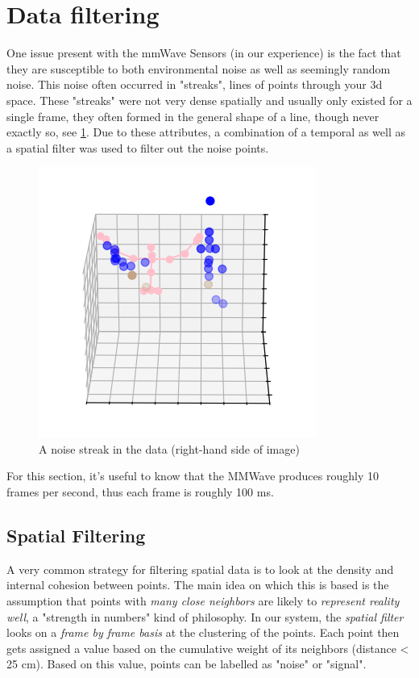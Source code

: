 \section{Data filtering}
\label{section: tracking method - data filtering}

One issue present with the mmWave Sensors (in our experience) is the fact that they are susceptible to both environmental noise as well as seemingly random noise. 
This noise often occurred in "streaks", lines of points through your 3d space. 
These "streaks" were not very dense spatially and usually only existed for a single frame, they often formed in the general shape of a line, though never exactly so, see \cref{figure: noise steak}.
Due to these attributes, a combination of a temporal as well as a spatial filter was used to filter out the noise points.

\begin{figure}
    \centering
    \includegraphics[width=0.5\linewidth]{figures/internal data/noise streak.png}
    \caption{A noise streak in the data (right-hand side of image)}
    \label{figure: noise steak}
\end{figure}

For this section, it's useful to know that the MMWave produces roughly 10 frames per second, thus each frame is roughly 100 ms.

\subsection{Spatial Filtering}
\label{sub-section: tracking method - data filtering - density filtering}

A very common strategy for filtering spatial data is to look at the density and internal cohesion between points.
The main idea on which this is based is the assumption that points with \textit{many close neighbors} are likely to \textit{represent reality well}, a "strength in numbers" kind of philosophy.
In our system, the \textit{spatial filter} looks on a \textit{frame by frame basis} at the clustering of the points.
Each point then gets assigned a value based on the cumulative weight of its neighbors (distance < 25 cm). 
Based on this value, points can be labelled as "noise" or "signal".

